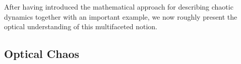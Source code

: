 







After having introduced the mathematical approach for describing 
chaotic dynamics together with an important example, we now roughly present
the optical understanding of this multifaceted notion.

\subsection{Optical Chaos}

